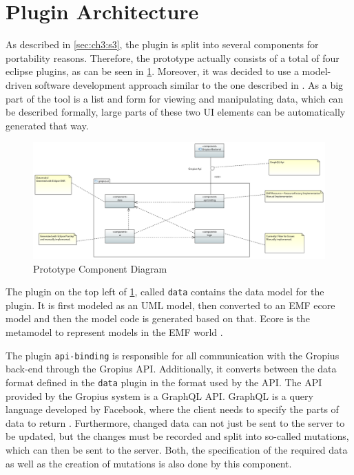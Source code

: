 \section{Plugin Architecture}
\label{sec:ch4:s3}
As described in \cref{sec:ch3:s3}, the plugin is split into several components for portability reasons.
Therefore, the prototype actually consists of a total of four eclipse plugins, as can be seen in \cref{fig:c4:component_diagram}.
Moreover, it was decided to use a model-driven software development approach similar to the one described in \cite{beydeda2005model}.
As a big part of the tool is a list and form for viewing and manipulating data, which can be described formally,
large parts of these two \gls{UI} elements can be automatically generated that way.

\begin{figure}[!h]
	\centering
	\includegraphics[width=\textwidth]{graphics/Component_Diagram.png}
	\caption{Prototype Component Diagram}
	\label{fig:c4:component_diagram}
\end{figure}

The plugin on the top left of \cref{fig:c4:component_diagram}, called \lstinline|data| contains the data model for the plugin. 
It is first modeled as an \gls{UML} model, then converted to an \gls{EMF} ecore model and then the model code is generated based on that.
Ecore is the metamodel to represent models in the \gls{EMF} world \cite{steinberg2008emf}.

The plugin \lstinline|api-binding| is responsible for all communication with the Gropius back-end through the Gropius \gls{API}.
Additionally, it converts between the data format defined in the \lstinline|data| plugin in the format used by the \gls{API}.
The \gls{API} provided by the Gropius system is a GraphQL \gls{API}.
GraphQL is a query language developed by Facebook, where the client needs to specify the parts of data to return \cite{grpahql2018}.
Furthermore, changed data can not just be sent to the server to be updated, but the changes must be recorded and split into so-called mutations,
which can then be sent to the server.
Both, the specification of the required data as well as the creation of mutations is also done by this component.

